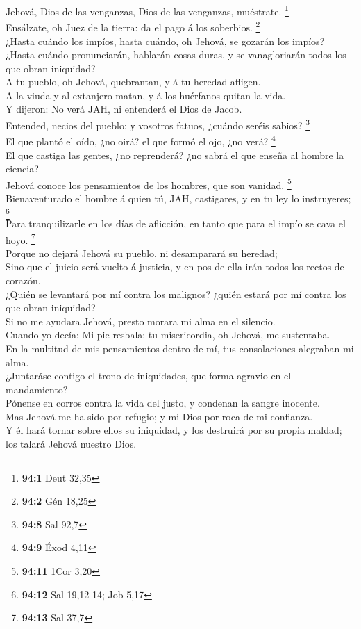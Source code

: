  Jehová, Dios de las venganzas, Dios de las venganzas,
muéstrate. \footnote{\textbf{94:1} Deut 32,35}\\
 Ensálzate, oh Juez de la tierra: da el pago á los
soberbios. \footnote{\textbf{94:2} Gén 18,25}\\
 ¿Hasta cuándo los impíos, hasta cuándo, oh Jehová, se
gozarán los impíos?\\
 ¿Hasta cuándo pronunciarán, hablarán cosas duras, y se
vanagloriarán todos los que obran iniquidad?\\
 A tu pueblo, oh Jehová, quebrantan, y á tu heredad
afligen.\\
 A la viuda y al extanjero matan, y á los huérfanos quitan
la vida.\\
 Y dijeron: No verá JAH, ni entenderá el Dios de Jacob.\\
 Entended, necios del pueblo; y vosotros fatuos, ¿cuándo
seréis sabios? \footnote{\textbf{94:8} Sal 92,7}\\
 El que plantó el oído, ¿no oirá? el que formó el ojo, ¿no
verá? \footnote{\textbf{94:9} Éxod 4,11}\\
 El que castiga las gentes, ¿no reprenderá? ¿no sabrá el
que enseña al hombre la ciencia?\\
 Jehová conoce los pensamientos de los hombres, que son
vanidad. \footnote{\textbf{94:11} 1Cor 3,20}\\
 Bienaventurado el hombre á quien tú, JAH, castigares, y en
tu ley lo instruyeres; \footnote{\textbf{94:12} Sal 19,12-14; Job 5,17}\\
 Para tranquilizarle en los días de aflicción, en tanto que
para el impío se cava el hoyo. \footnote{\textbf{94:13} Sal 37,7}\\
 Porque no dejará Jehová su pueblo, ni desamparará su
heredad;\\
 Sino que el juicio será vuelto á justicia, y en pos de
ella irán todos los rectos de corazón.\\
 ¿Quién se levantará por mí contra los malignos? ¿quién
estará por mí contra los que obran iniquidad?\\
 Si no me ayudara Jehová, presto morara mi alma en el
silencio.\\
 Cuando yo decía: Mi pie resbala: tu misericordia, oh
Jehová, me sustentaba.\\
 En la multitud de mis pensamientos dentro de mí, tus
consolaciones alegraban mi alma.\\
 ¿Juntaráse contigo el trono de iniquidades, que forma
agravio en el mandamiento?\\
 Pónense en corros contra la vida del justo, y condenan la
sangre inocente.\\
 Mas Jehová me ha sido por refugio; y mi Dios por roca de
mi confianza.\\
 Y él hará tornar sobre ellos su iniquidad, y los destruirá
por su propia maldad; los talará Jehová nuestro Dios.

